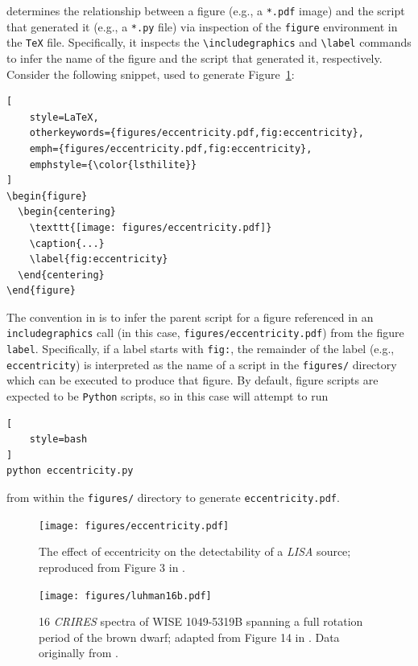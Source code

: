 \documentclass[twocolumn]{aastex631}
\begin{document}
\showyourwork determines the relationship between a figure (e.g., a \texttt{*.pdf} image) and the script that generated it (e.g., a \texttt{*.py} file) via inspection of the \texttt{figure} environment in the \texttt{TeX} file. 
Specifically, it inspects the \texttt{{\textbackslash}includegraphics} and \texttt{{\textbackslash}label} commands to infer the name of the figure and the script that generated it, respectively.
Consider the following snippet, used to generate Figure~\ref{fig:eccentricity}:
%
\begin{lstlisting}[
    style=LaTeX,
    otherkeywords={figures/eccentricity.pdf,fig:eccentricity},
    emph={figures/eccentricity.pdf,fig:eccentricity},
    emphstyle={\color{lsthilite}}
]
\begin{figure}
  \begin{centering}
    \texttt{[image: figures/eccentricity.pdf]}
    \caption{...}
    \label{fig:eccentricity}
  \end{centering}
\end{figure}
\end{lstlisting}
%
The convention in \showyourwork is to infer the parent script for a figure referenced in an \texttt{includegraphics} call (in this case, {\color{lsthilite}\texttt{figures/eccentricity.pdf}}) from the figure \texttt{label}. 
Specifically, if a label starts with {\color{lsthilite}\texttt{fig:}}, the remainder of the label (e.g., {\color{lsthilite}\texttt{eccentricity}}) is interpreted as the name of a script in the \texttt{figures/} directory which can be executed to produce that figure. 
By default, figure scripts are expected to be \texttt{Python} scripts, so in this case \showyourwork will attempt to run
%
\begin{lstlisting}[
    style=bash
]
python eccentricity.py
\end{lstlisting}
%
from within the \texttt{figures/} directory to generate \texttt{eccentricity.pdf}.

\begin{figure}[ht!]
    \begin{centering}
        \texttt{[image: figures/eccentricity.pdf]}
        \caption{
            The effect of eccentricity on the detectability of a \emph{LISA} source; reproduced from Figure 3 in \citet{Wagg2021}.
        }
        \label{fig:eccentricity}
    \end{centering}
\end{figure}

\begin{figure}[ht!]
    \begin{centering}
        \texttt{[image: figures/luhman16b.pdf]}
        \caption{
            16 \emph{CRIRES} spectra of WISE 1049-5319B spanning a full rotation period of the brown dwarf; adapted from Figure 14 in \citet{Luger2021}. 
            Data originally from \citet{Crossfield2014}.
        }
        \label{fig:luhman16b}
    \end{centering}
\end{figure}
\end{document}
